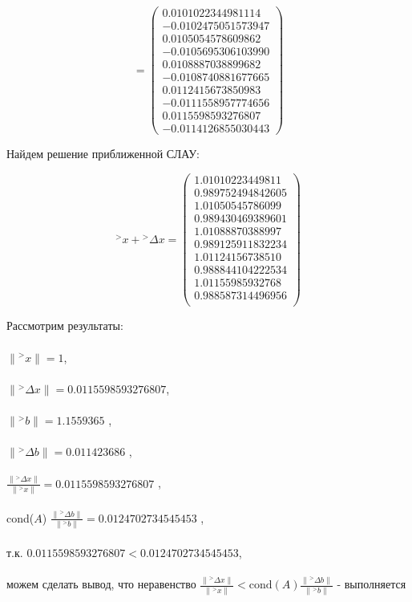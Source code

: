 \documentclass[a4paper, 12pt]{extarticle}
\begin{document}
\begin{equation}
     = \begin{pmatrix}
        0.0101022344981114\\ 
        -0.0102475051573947\\ 
        0.0105054578609862\\ 
        -0.0105695306103990\\ 
        0.0108887038899682\\ 
        -0.0108740881677665\\ 
        0.0112415673850983\\ 
        -0.0111558957774656\\ 
        0.0115598593276807\\ 
        -0.0114126855030443
    \end{pmatrix}
\end{equation}

Найдем решение приближенной СЛАУ:

\begin{equation}
    {^> x} + {^> \Delta x} = \begin{pmatrix}
        1.01010223449811\\ 
        0.989752494842605\\ 
        1.01050545786099\\ 
        0.989430469389601\\ 
        1.01088870388997\\ 
        0.989125911832234\\ 
        1.01124156738510\\ 
        0.988844104222534\\ 
        1.01155985932768\\ 
        0.988587314496956\\
   \end{pmatrix}
\end{equation}

Рассмотрим результаты: \\\\
$ \lVert {^>x}         \rVert = 1 $, \\\\
$ \lVert {^> \Delta x} \rVert = 0.0115598593276807 $, \\\\
$ \lVert {^>b}         \rVert = 1.1559365 $ , \\\\
$ \lVert {^> \Delta b} \rVert = 0.011423686 $ , \\\\
$\frac{\lVert {^> \Delta x} \rVert}{\lVert {^>x} \rVert} = 0.0115598593276807 $ , \\\\
cond($A$) $\frac{\lVert {^> \Delta b} \rVert}{\lVert {^>b} \rVert} = 0.0124702734545453 $ , \\\\
т.к. $0.0115598593276807 < 0.0124702734545453$, \\\\
можем сделать вывод, что неравенство $\frac{\lVert {^> \Delta x} \rVert}{\lVert {^>x} \rVert} < \textrm{cond}(A) \frac{\lVert {^> \Delta b} \rVert}{\lVert {^>b} \rVert}$ - выполняется \\
\end{document}
